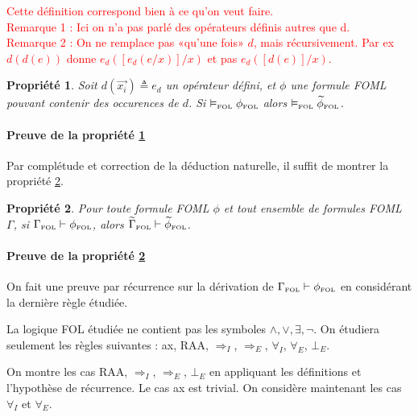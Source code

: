 \documentclass[12pt]{article}
\newcommand{\FOL}{\ensuremath{\textup{\tiny{}FOL}}}
\newcommand{\raph}[1]{\textcolor{red}{#1}}
\newtheorem{prop}{Propriété}
\begin{document}
\raph{%
  Cette définition correspond bien à ce qu'on veut faire.\\
  Remarque 1 : Ici on n'a pas parlé des opérateurs définis autres que d.\\
  Remarque 2 : On ne remplace pas «qu'une fois» $d$, mais récursivement.
  Par ex $d(d(e))$ donne $e_d([e_d(e/x)]/x)$ et pas $e_d([d(e)]/x)$.}


\begin{prop}
  \label{prop-sem}
Soit $d(\vec{x_i}) \triangleq e_d$ un opérateur défini, et $\phi$ une formule FOML pouvant contenir des occurences de $d$.
Si $\vDash_\FOL \phi_\FOL$ alors $\vDash_\FOL \widetilde{\phi}_\FOL$.
\end{prop}

\paragraph{Preuve de la propriété \ref{prop-sem}}
Par complétude et correction de la déduction naturelle, il suffit de montrer la propriété \ref{prop-syn}.

\begin{prop}
  \label{prop-syn}
  Pour toute formule FOML $\phi$ et tout ensemble de formules FOML $\Gamma$,
  si $\Gamma_\FOL \vdash \phi_\FOL$, alors $\widetilde{\Gamma}_\FOL \vdash \widetilde{\phi}_\FOL$.
\end{prop}

\paragraph{Preuve de la propriété \ref{prop-syn}}
On fait une preuve par récurrence sur la dérivation de $\Gamma_\FOL \vdash \phi_\FOL$ en considérant la dernière règle étudiée.

La logique FOL étudiée ne contient pas les symboles $\land, \lor, \exists, \neg$.
On étudiera seulement les règles suivantes : ax, RAA, $\Rightarrow_I$, $\Rightarrow_E$, $\forall_I$, $\forall_E$, $\bot_E$.

On montre les cas RAA, $\Rightarrow_I$, $\Rightarrow_E$, $\bot_E$ en appliquant les définitions et l'hypothèse de récurrence.
Le cas ax est trivial.
On considère maintenant les cas $\forall_I$ et $\forall_E$.
\end{document}
